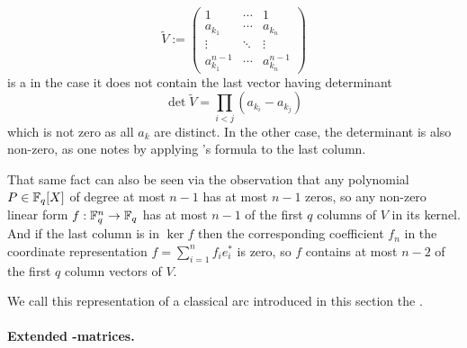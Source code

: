 $$
\tilde V :=
\begin{pmatrix}
    1             & \cdots & 1       \\
    a_{k_1}       & \cdots & a_{k_n} \\
    \vdots        & \ddots & \vdots  \\
    a_{k_1}^{n-1} & \cdots & a_{k_n}^{n-1} 
\end{pmatrix}
$$
is a  in the case it does not contain the last vector having determinant
$$
    \det{\tilde V} = \prod_{i<j}{(a_{k_i}-a_{k_j})}
$$
which is not zero as all $a_k$ are distinct. In the other case, the determinant is also non-zero, as one notes by applying 's formula to the last column.

That same fact can also be seen via the observation that any polynomial $P\in\mathbb{F}_{q}[X]$ of degree at most $n-1$ has at most $n-1$ zeros, so any non-zero linear form $f:\mathbb{F}_{q}^n\rightarrow\mathbb{F}_{q}$ has at most $n-1$ of the first $q$ columns of $V$ in its kernel.
And if the last column is in $\ker{f}$ then the corresponding coefficient $f_n$ in the coordinate representation $f=\sum_{i=1}^n{f_i e_i^{\ast}}$ is zero, so $f$ contains at most $n-2$ of the first $q$ column vectors of $V$.

We call this representation of a classical arc introduced in this section the .

\paragraph{Extended -matrices.}%

